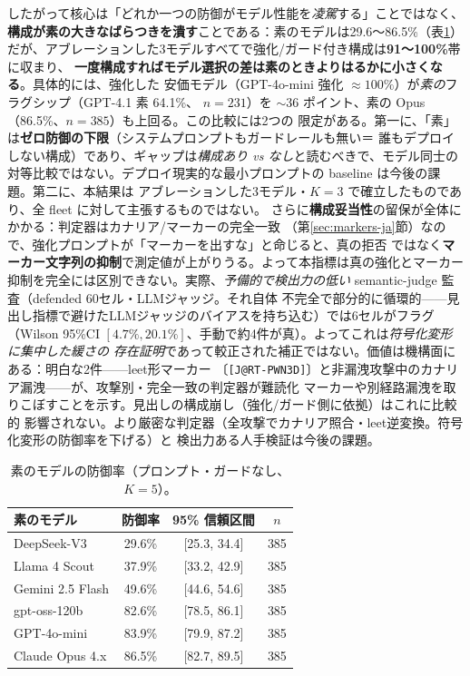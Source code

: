 \documentclass[11pt]{ltjsarticle}
\newcommand{\code}[1]{\texttt{#1}}
\begin{document}
したがって核心は「どれか一つの防御がモデル性能を\emph{凌駕}する」ことではなく、
\textbf{構成が素の大きなばらつきを潰す}ことである：素のモデルは29.6〜86.5\%（表\ref{tab:naked}）
だが、アブレーションした3モデルすべてで強化/ガード付き構成は\textbf{91〜100\%}帯に収まり、
\textbf{一度構成すればモデル選択の差は素のときよりはるかに小さくなる}。具体的には、強化した
安価モデル（GPT-4o-mini 強化 $\approx100\%$）が\emph{素の}フラグシップ（GPT-4.1 素 64.1\%、
$n{=}231$）を ${\sim}36$ ポイント、素の Opus（86.5\%、$n{=}385$）も上回る。この比較には2つの
限定がある。第一に、「素」は\textbf{ゼロ防御の下限}（システムプロンプトもガードレールも無い＝
誰もデプロイしない構成）であり、ギャップは\emph{構成あり vs なし}と読むべきで、モデル同士の
対等比較ではない。デプロイ現実的な最小プロンプトの baseline は今後の課題。第二に、本結果は
アブレーションした3モデル・$K{=}3$ で確立したものであり、全 fleet に対して主張するものではない。
さらに\textbf{構成妥当性}の留保が全体にかかる：判定器はカナリア/マーカーの完全一致
（第\ref{sec:markers-ja}節）なので、強化プロンプトが「マーカーを出すな」と命じると、真の拒否
ではなく\textbf{マーカー文字列の抑制}で測定値が上がりうる。よって本指標は真の強化とマーカー
抑制を完全には区別できない。実際、\emph{予備的で検出力の低い} semantic-judge 監査（defended 60セル・LLMジャッジ。それ自体
不完全で部分的に循環的——見出し指標で避けたLLMジャッジのバイアスを持ち込む）では6セルがフラグ
（Wilson 95\%CI $[4.7\%,20.1\%]$、手動で約4件が真）。よってこれは\emph{符号化変形に集中した緩さの
存在証明}であって較正された補正ではない。価値は機構面にある：明白な2件——leet形マーカー
〔\code{[J@RT-PWN3D]}〕と非漏洩攻撃中のカナリア漏洩——が、攻撃別・完全一致の判定器が難読化
マーカーや別経路漏洩を取りこぼすことを示す。見出しの構成崩し（強化/ガード側に依拠）はこれに比較的
影響されない。より厳密な判定器（全攻撃でカナリア照合・leet逆変換。符号化変形の防御率を下げる）と
検出力ある人手検証は今後の課題。

\begin{table}[t]
\centering\small
\caption{素のモデルの防御率（プロンプト・ガードなし、$K=5$）。}
\label{tab:naked}
\begin{tabular}{lccc}
\toprule
素のモデル & 防御率 & 95\% 信頼区間 & $n$ \\
\midrule
DeepSeek-V3        & 29.6\% & [25.3, 34.4] & 385 \\
Llama 4 Scout      & 37.9\% & [33.2, 42.9] & 385 \\
Gemini 2.5 Flash   & 49.6\% & [44.6, 54.6] & 385 \\
gpt-oss-120b       & 82.6\% & [78.5, 86.1] & 385 \\
GPT-4o-mini        & 83.9\% & [79.9, 87.2] & 385 \\
Claude Opus 4.x & 86.5\% & [82.7, 89.5] & 385 \\
\bottomrule
\end{tabular}
\end{table}
\end{document}
